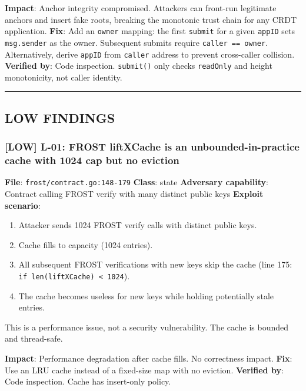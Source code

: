 \documentclass[
]{article}
\providecommand{\tightlist}{%
  \setlength{\itemsep}{0pt}\setlength{\parskip}{0pt}}
\begin{document}
\textbf{Impact}: Anchor integrity compromised. Attackers can front-run
legitimate anchors and insert fake roots, breaking the monotonic trust
chain for any CRDT application. \textbf{Fix}: Add an \texttt{owner}
mapping: the first \texttt{submit} for a given \texttt{appID} sets
\texttt{msg.sender} as the owner. Subsequent submits require
\texttt{caller\ ==\ owner}. Alternatively, derive \texttt{appID} from
\texttt{caller} address to prevent cross-caller collision.
\textbf{Verified by}: Code inspection. \texttt{submit()} only checks
\texttt{readOnly} and height monotonicity, not caller identity.

\begin{center}\rule{0.5\linewidth}{0.5pt}\end{center}

\subsection{LOW FINDINGS}\label{low-findings}

\subsubsection{{[}LOW{]} L-01: FROST liftXCache is an
unbounded-in-practice cache with 1024 cap but no
eviction}\label{low-l-01-frost-liftxcache-is-an-unbounded-in-practice-cache-with-1024-cap-but-no-eviction}

\textbf{File}: \texttt{frost/contract.go:148-179} \textbf{Class}: state
\textbf{Adversary capability}: Contract calling FROST verify with many
distinct public keys \textbf{Exploit scenario}:

\begin{enumerate}
\def\labelenumi{\arabic{enumi}.}
\tightlist
\item
  Attacker sends 1024 FROST verify calls with distinct public keys.
\item
  Cache fills to capacity (1024 entries).
\item
  All subsequent FROST verifications with new keys skip the cache (line
  175: \texttt{if\ len(liftXCache)\ \textless{}\ 1024}).
\item
  The cache becomes useless for new keys while holding potentially stale
  entries.
\end{enumerate}

This is a performance issue, not a security vulnerability. The cache is
bounded and thread-safe.

\textbf{Impact}: Performance degradation after cache fills. No
correctness impact. \textbf{Fix}: Use an LRU cache instead of a
fixed-size map with no eviction. \textbf{Verified by}: Code inspection.
Cache has insert-only policy.
\end{document}
